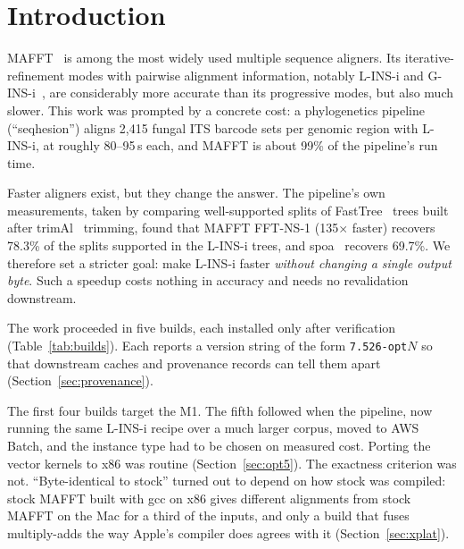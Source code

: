 \documentclass[11pt]{article}
\newcommand{\code}[1]{\texttt{#1}}
\begin{document}
\section{Introduction}

MAFFT~\cite{katoh2002,katoh2013} is among the most widely used multiple sequence aligners.
Its iterative-refinement modes with pairwise alignment information, notably L-INS-i and
G-INS-i~\cite{katoh2005}, are considerably more accurate than its progressive modes, but
also much slower. This work was prompted by a concrete cost: a phylogenetics pipeline
(``seqhesion'') aligns 2{,}415 fungal ITS barcode sets per genomic region with L-INS-i, at
roughly 80--95\,s each, and MAFFT is about 99\% of the pipeline's run time.

Faster aligners exist, but they change the answer. The pipeline's own measurements, taken
by comparing well-supported splits of FastTree~\cite{price2010} trees built after
trimAl~\cite{capella2009} trimming, found that MAFFT FFT-NS-1 (135$\times$ faster) recovers
78.3\% of the splits supported in the L-INS-i trees, and spoa~\cite{vaser2017} recovers
69.7\%. We therefore set a stricter goal: make L-INS-i faster \emph{without changing a single
output byte}. Such a speedup costs nothing in accuracy and needs no revalidation downstream.

The work proceeded in five builds, each installed only after verification
(Table~\ref{tab:builds}). Each reports a version string of the form \code{7.526-opt}$N$ so
that downstream caches and provenance records can tell them apart
(Section~\ref{sec:provenance}).

The first four builds target the M1. The fifth followed when the pipeline, now running the
same L-INS-i recipe over a much larger corpus, moved to AWS Batch, and the instance type had to be chosen on measured cost. Porting the vector kernels to
x86 was routine (Section~\ref{sec:opt5}). The exactness criterion was not. ``Byte-identical to
stock'' turned out to depend on how stock was compiled: stock MAFFT built with gcc on x86
gives different alignments from stock MAFFT on the Mac for a third of the inputs, and only a
build that fuses multiply-adds the way Apple's compiler does agrees with it
(Section~\ref{sec:xplat}).
\end{document}
